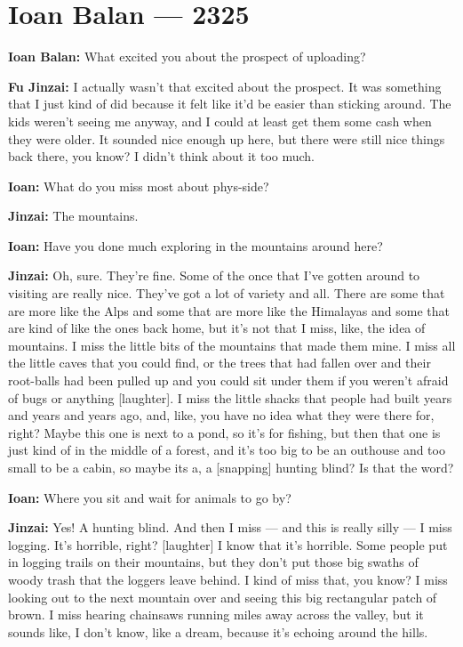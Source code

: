 \hypertarget{ioan-balan-2325}{%
\chapter{Ioan Balan — 2325}\label{ioan-balan-2325}}

\textbf{Ioan Balan:} What excited you about the prospect of uploading?

\textbf{Fu Jinzai:} I actually wasn't that excited about the prospect. It was something that I just kind of did because it felt like it'd be easier than sticking around. The kids weren't seeing me anyway, and I could at least get them some cash when they were older. It sounded nice enough up here, but there were still nice things back there, you know? I didn't think about it too much.

\textbf{Ioan:} What do you miss most about phys-side?

\textbf{Jinzai:} The mountains.

\textbf{Ioan:} Have you done much exploring in the mountains around here?

\textbf{Jinzai:} Oh, sure. They're fine. Some of the once that I've gotten around to visiting are really nice. They've got a lot of variety and all. There are some that are more like the Alps and some that are more like the Himalayas and some that are kind of like the ones back home, but it's not that I miss, like, the idea of mountains. I miss the little bits of the mountains that made them mine. I miss all the little caves that you could find, or the trees that had fallen over and their root-balls had been pulled up and you could sit under them if you weren't afraid of bugs or anything {[}laughter{]}. I miss the little shacks that people had built years and years and years ago, and, like, you have no idea what they were there for, right? Maybe this one is next to a pond, so it's for fishing, but then that one is just kind of in the middle of a forest, and it's too big to be an outhouse and too small to be a cabin, so maybe its a, a {[}snapping{]} hunting blind? Is that the word?

\textbf{Ioan:} Where you sit and wait for animals to go by?

\textbf{Jinzai:} Yes! A hunting blind. And then I miss — and this is really silly — I miss logging. It's horrible, right? {[}laughter{]} I know that it's horrible. Some people put in logging trails on their mountains, but they don't put those big swaths of woody trash that the loggers leave behind. I kind of miss that, you know? I miss looking out to the next mountain over and seeing this big rectangular patch of brown. I miss hearing chainsaws running miles away across the valley, but it sounds like, I don't know, like a dream, because it's echoing around the hills.

